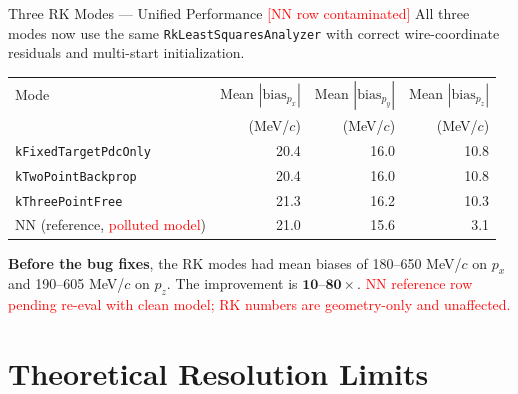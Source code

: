\documentclass[aspectratio=169]{beamer}
\begin{document}
\begin{frame}{Three RK Modes --- Unified Performance \textcolor{red}{[NN row contaminated]}}
\small
All three modes now use the same \texttt{RkLeastSquaresAnalyzer} with correct wire-coordinate residuals and multi-start initialization.

\begin{table}
\centering
\begin{tabular}{lrrr}
\toprule
Mode & Mean $|\mathrm{bias}_{p_x}|$ & Mean $|\mathrm{bias}_{p_y}|$ & Mean $|\mathrm{bias}_{p_z}|$ \\
 & (MeV/$c$) & (MeV/$c$) & (MeV/$c$) \\
\midrule
\texttt{kFixedTargetPdcOnly} & 20.4 & 16.0 & 10.8 \\
\texttt{kTwoPointBackprop} & 20.4 & 16.0 & 10.8 \\
\texttt{kThreePointFree} & 21.3 & 16.2 & 10.3 \\
\midrule
NN (reference, \textcolor{red}{polluted model}) & 21.0 & 15.6 & 3.1 \\
\bottomrule
\end{tabular}
\end{table}

\vspace{0.2cm}
\textbf{Before the bug fixes}, the RK modes had mean biases of 180--650 MeV/$c$ on $p_x$ and 190--605 MeV/$c$ on $p_z$. The improvement is $\mathbf{10\text{--}80\times}$. \textcolor{red}{NN reference row pending re-eval with clean model; RK numbers are geometry-only and unaffected.}
\end{frame}

\section{Theoretical Resolution Limits}
\end{document}
